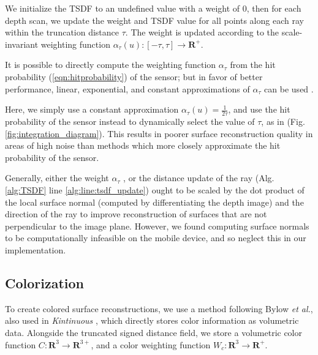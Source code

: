 \documentclass[conference]{IEEEtran}
\newcommand{\eref}[1]{(\ref{#1})}
\newcommand{\figref}[1]{Fig.\ref{#1}}
\newcommand{\algoref}[1]{Alg.\ref{#1}}
\newcommand{\etal}{\textit{et al.}}
\begin{document}
We initialize the TSDF to an undefined value with a
weight of $0$, then for each depth scan, we update the weight and TSDF value
for all points along each ray within the truncation distance $\tau$. The weight
is updated according to the scale-invariant weighting function $\alpha_{\tau}(u)
:[-\tau,\tau]\to \mathbf{R^{+}} $.

% 
%  

 It is possible \cite{Nguyen2012} to directly compute the weighting function
 $\alpha_{\tau}$ from the hit probability \eref{eqn:hitprobability} of the
 sensor; but in favor of better performance, linear, exponential, and constant
 approximations of $\alpha_{\tau}$ can be used \cite{Curless1996, Newcombe,
 Whelan2013, Bylow2013}.

Here, we simply use a constant approximation $\alpha_{\tau}(u) = \frac{1}{2
\tau}$, and use the hit probability of the sensor instead to  dynamically select
the value of $\tau$, as in \cite{Nguyen2012} (\figref{fig:integration_diagram}).
This results in poorer surface reconstruction quality in areas of high noise
than methods which more closely approximate the hit probability of the sensor.

Generally, either the weight $\alpha_{\tau}$ \cite{Newcombe, Whelan2013}, or
the distance update of the ray (\algoref{alg:TSDF} line
\ref{alg:line:tsdf_update}) \cite{Curless1996, Bylow2013} ought to be scaled by
the dot product of the local surface normal (computed by differentiating the
depth image) and the direction of the ray to improve reconstruction of surfaces
that are not perpendicular to the image plane. However, we found computing
surface normals to be computationally infeasible on the mobile device, and so
neglect this in our implementation.

\subsection{Colorization}
\label{section:color}
To create colored surface reconstructions, we use a method following Bylow
\etal \cite{Bylow2013}, also used in \textit{Kintinuous} \cite{Whelan2013},
which directly stores color information as volumetric data. Alongside the
truncated signed distance field, we store a volumetric color function
$C : \mathbf{R}^3 \to \mathbf{R}^{3+}$, and a color weighting function
$W_{c} :
\mathbf{R}^3 \to \mathbf{R^{+}}$.
\end{document}
